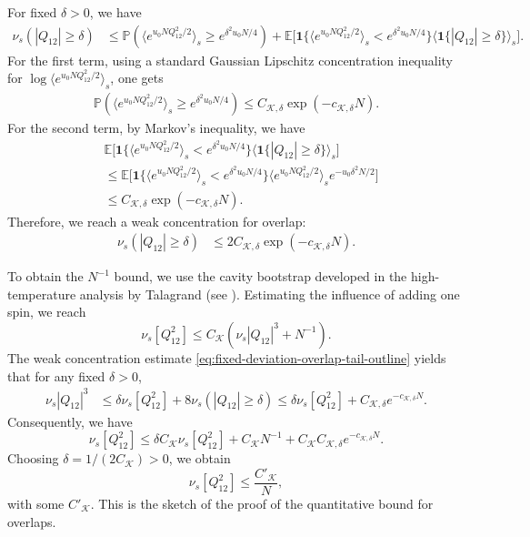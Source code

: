 \documentclass[11pt]{article}
\numberwithin{equation}{section}
\newcommand{\1}{\mathbf 1}
\newcommand{\cK}{\mathcal K}
\begin{document}
For fixed $\delta>0$, we have 
\begin{align*}
        \nu_s\left(
|Q_{12}|\ge\delta
\right)&\le \mathbb P( \langle e^{u_0 N Q_{12}^2/2} \rangle_s\ge e^{\delta^2 u_0 N/4}) + \mathbb E \Big[\mathbf{1}\{\langle e^{u_0 N Q_{12}^2/2} \rangle_s<e^{\delta^2 u_0 N/4}\}\langle \mathbf{1}\{|Q_{12}|\ge\delta\}\rangle_s\Big].
\end{align*}
For the first term,  using a standard Gaussian Lipschitz concentration inequality for $\log \langle e^{u_0 N Q_{12}^2/2} \rangle_s$,  one gets 
\begin{align*}
\mathbb P( \langle e^{u_0 N Q_{12}^2/2} \rangle_s\ge e^{\delta^2 u_0 N/4})\leq C_{\mathcal K,\delta}
\exp(-c_{\mathcal K,\delta}N).
\end{align*}
For the  second term, by Markov's inequality, we have
\begin{align*}
    &\mathbb E \Big[\mathbf{1}\{\langle e^{u_0 N Q_{12}^2/2} \rangle_s<e^{\delta^2 u_0 N/4}\}\langle \mathbf{1}\{|Q_{12}|\ge\delta\}\rangle_s\Big]\\
    &\leq \mathbb E \Big[\mathbf{1}\{\langle e^{u_0 N Q_{12}^2/2} \rangle_s<e^{\delta^2 u_0 N/4}\}\langle e^{u_0 N Q_{12}^2/2}\rangle_s e^{-u_0 \delta^2 N/2}\Big]\\
&\le
C_{\mathcal K,\delta}
\exp(-c_{\mathcal K,\delta}N).
\end{align*}
Therefore, we reach a weak concentration for overlap:
\begin{equation}
\begin{split}
    \nu_s\left(
|Q_{12}|\ge\delta
\right)&\leq 
2 C_{\mathcal K,\delta}
\exp(-c_{\mathcal K,\delta}N).
\label{eq:fixed-deviation-overlap-tail-outline}
\end{split}
\end{equation}

To obtain the $N^{-1}$ bound, we use
the cavity bootstrap developed in the high-temperature analysis by Talagrand (see \cite[Chapter~1]{Talagrand}).
Estimating the influence of adding one spin, we reach
\begin{equation}
\nu_s[Q_{12}^2] \leq C_\cK 
 \left(
\nu_s|Q_{12}|^3+N^{-1}
\right).
\label{eq:cavity-remainder-outline}
\end{equation}
The weak concentration estimate \eqref{eq:fixed-deviation-overlap-tail-outline} yields that for any fixed
$\delta >0$,
\begin{align}
\nu_s|Q_{12}|^3
&\le
\delta\nu_s[Q_{12}^2]
+
8\nu_s\left(|Q_{12}|\ge\delta\right) \le
\delta \nu_s[Q_{12}^2]+
C_{\mathcal K,\delta}e^{-c_{\mathcal K,\delta}N}.
\label{eq:cubic-bootstrap-outline}
\end{align}
Consequently, we have
\[
\nu_s[Q_{12}^2] \leq \delta C_\cK \nu_s[Q_{12}^2] +  C_\cK N^{-1} + C_\cK C_{\cK,\delta}e^{-c_{\mathcal K,\delta}N}.
\]
Choosing $\delta=1/(2C_\cK)>0$, we obtain
\begin{equation}
\nu_s[Q_{12}^2]
\le
\frac{C'_{\mathcal K}}{N},
\label{eq:optimal-overlap-bound-outline}
\end{equation}
with some $C'_\cK$.
This is the sketch of the proof of the quantitative bound for overlaps.
\end{document}
